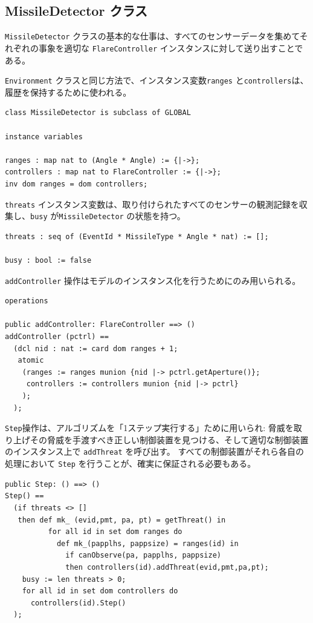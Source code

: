 \documentclass[\pformat,12pt]{jreport}
\begin{document}
\subsection{MissileDetector クラス}

 \texttt{MissileDetector} クラスの基本的な仕事は、すべてのセンサーデータを集めてそれぞれの事象を適切な \texttt{FlareController} インスタンスに対して送り出すことである。

  \texttt{Environment}  クラスと同じ方法で、インスタンス変数\texttt{ranges}  と\texttt{controllers}は、履歴を保持するために使われる。

\begin{lstlisting}
class MissileDetector is subclass of GLOBAL

instance variables

ranges : map nat to (Angle * Angle) := {|->};
controllers : map nat to FlareController := {|->};
inv dom ranges = dom controllers;
\end{lstlisting}

  \texttt{threats} インスタンス変数は、取り付けられたすべてのセンサーの観測記録を収集し、\texttt{busy} が\texttt{MissileDetector} の状態を持つ。

\begin{lstlisting}
threats : seq of (EventId * MissileType * Angle * nat) := [];

busy : bool := false
\end{lstlisting}

 \texttt{addController} 操作はモデルのインスタンス化を行うためにのみ用いられる。
\begin{lstlisting}
operations

public addController: FlareController ==> ()
addController (pctrl) ==
  (dcl nid : nat := card dom ranges + 1;
   atomic
    (ranges := ranges munion {nid |-> pctrl.getAperture()};
     controllers := controllers munion {nid |-> pctrl}
    );
  );
\end{lstlisting}

\texttt{Step}操作は、アルゴリズムを「1ステップ実行する」ために用いられ:
脅威を取り上げその脅威を手渡すべき正しい制御装置を見つける、そして適切な制御装置のインスタンス上で \texttt{addThreat} を呼び出す。
すべての制御装置がそれら各自の処理において \texttt{Step} を行うことが、確実に保証される必要もある。

\begin{lstlisting}
public Step: () ==> ()
Step() ==
  (if threats <> []
   then def mk_ (evid,pmt, pa, pt) = getThreat() in
          for all id in set dom ranges do
            def mk_(papplhs, pappsize) = ranges(id) in
              if canObserve(pa, papplhs, pappsize)
              then controllers(id).addThreat(evid,pmt,pa,pt);
    busy := len threats > 0;
    for all id in set dom controllers do
      controllers(id).Step()
  );
\end{lstlisting}
\end{document}
